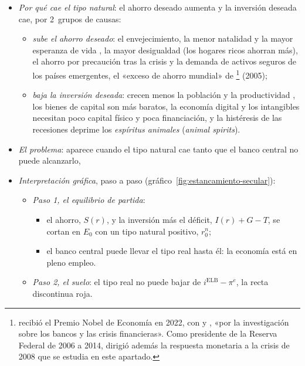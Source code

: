 \documentclass[11pt]{article}
\begin{document}
\begin{itemize}
\item \emph{Por qué cae el tipo natural}: el ahorro deseado aumenta y la inversión deseada cae, por 2~grupos de causas\nocite{RachelSummers2019Secular}:
  \begin{itemize}
  \item \emph{sube el ahorro deseado}: el envejecimiento, la menor natalidad y la mayor esperanza de vida , la mayor desigualdad (los hogares ricos ahorran más), el ahorro por precaución tras la crisis  y la demanda de activos seguros de los países emergentes, el «exceso de ahorro mundial» de \footnote{ recibió el Premio Nobel de Economía en 2022, con  y , «por la investigación sobre los bancos y las crisis financieras»\nocite{Nobel2022}. Como presidente de la Reserva Federal de 2006 a 2014, dirigió además la respuesta monetaria a la crisis de 2008 que se estudia en este apartado.} (2005)\nocite{Bernanke2005Saving};
  \item \emph{baja la inversión deseada}: crecen menos la población y la productividad  , los bienes de capital son más baratos, la economía digital y los intangibles necesitan poco capital físico y poca financiación, y la histéresis de las recesiones deprime los \emph{espíritus animales} (\emph{animal spirits}).
  \end{itemize}
\item \emph{El problema}: aparece cuando el tipo natural cae tanto que el banco central no puede alcanzarlo,
\item \emph{Interpretación gráfica}, paso a paso (gráfico~\ref{fig:estancamiento-secular}):
  \begin{itemize}
  \item \emph{Paso 1, el equilibrio de partida}:
    \begin{itemize}
    \item el ahorro, $S(r)$, y la inversión más el déficit, $I(r)+G-T$, se cortan en $E_0$ con un tipo natural positivo, $r^n_0$;
    \item el banco central puede llevar el tipo real hasta él: la economía está en pleno empleo.
    \end{itemize}
  \item \emph{Paso 2, el suelo}: el tipo real no puede bajar de $i^{\mathrm{ELB}}-\pi^e$, la recta discontinua roja.

\end{itemize}
\end{itemize}
\end{document}
